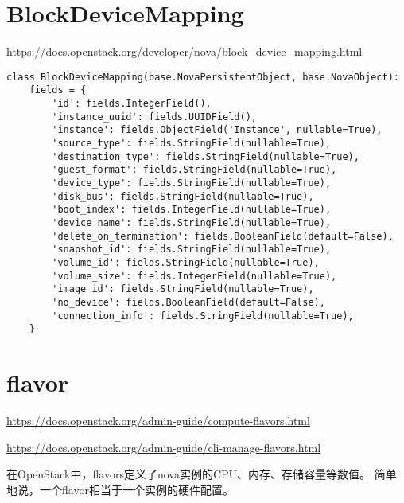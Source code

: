 \documentclass[a4paper,left=1.5cm,right=1.5cm,11pt]{article}
\begin{document}
\section{BlockDeviceMapping}
    \url{https://docs.openstack.org/developer/nova/block_device_mapping.html}

    \begin{lstlisting}
class BlockDeviceMapping(base.NovaPersistentObject, base.NovaObject):
    fields = {
        'id': fields.IntegerField(),
        'instance_uuid': fields.UUIDField(),
        'instance': fields.ObjectField('Instance', nullable=True),
        'source_type': fields.StringField(nullable=True),
        'destination_type': fields.StringField(nullable=True),
        'guest_format': fields.StringField(nullable=True),
        'device_type': fields.StringField(nullable=True),
        'disk_bus': fields.StringField(nullable=True),
        'boot_index': fields.IntegerField(nullable=True),
        'device_name': fields.StringField(nullable=True),
        'delete_on_termination': fields.BooleanField(default=False),
        'snapshot_id': fields.StringField(nullable=True),
        'volume_id': fields.StringField(nullable=True),
        'volume_size': fields.IntegerField(nullable=True),
        'image_id': fields.StringField(nullable=True),
        'no_device': fields.BooleanField(default=False),
        'connection_info': fields.StringField(nullable=True),
    }
    \end{lstlisting}
    
\section{flavor}
    \url{https://docs.openstack.org/admin-guide/compute-flavors.html}

    \url{https://docs.openstack.org/admin-guide/cli-manage-flavors.html}

    在OpenStack中，flavors定义了nova实例的CPU、内存、存储容量等数值。
    简单地说，一个flavor相当于一个实例的硬件配置。\par
\end{document}
